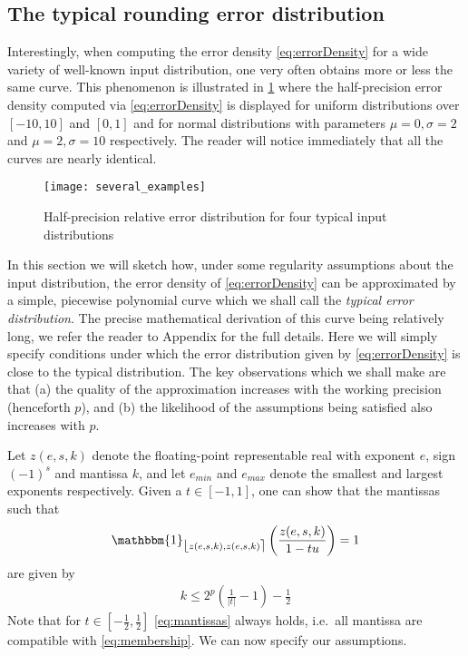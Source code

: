\documentclass[10pt,conference]{IEEEtran}
\newcommand{\ie}{i.e.\ }
\newcommand{\fintvl}[1][x]{\mathlarger{\lfloor}#1,#1\mathlarger{\rceil}}
\newcommand{\one}{\mathbbm{1}}
\newcommand{\absv}[1]{\vert #1\vert}
\begin{document}
\subsection{The typical rounding error distribution}
Interestingly, when computing the error density \cref{eq:errorDensity} for a wide variety of well-known input distribution, one very often obtains more or less the same curve. This phenomenon is illustrated in \cref{fig:errdist} where the half-precision error density computed via \cref{eq:errorDensity} is displayed for uniform distributions over $\left[-10,10\right]$ and $\left[0,1\right]$ and for normal distributions with parameters $\mu=0,\sigma=2$ and $\mu=2,\sigma=10$ respectively. The reader will notice immediately that all the curves are nearly identical.
\begin{figure}[h!]
\hspace{-1ex}\texttt{[image: several\_examples]}
\caption{Half-precision relative error distribution for four typical input distributions}
\label{fig:errdist}
\end{figure}
In this section we will sketch how, under some regularity assumptions about the input distribution, the error density of \cref{eq:errorDensity} can be approximated by a simple, piecewise polynomial curve which we shall call the \emph{typical error distribution}. The precise mathematical derivation of this curve being relatively long, we refer the reader to Appendix for the full details. Here we will simply specify conditions under which the error distribution given by \cref{eq:errorDensity} is close to the typical distribution. The key observations which we shall make are that (a) the quality of the approximation increases with the working precision (henceforth $p$), and (b) the likelihood of the assumptions being satisfied also increases with $p$.

Let $z(e,s,k)$ denote the floating-point representable real with exponent $e$, sign $(-1)^s$ and mantissa $k$, and let $e_{min}$ and $e_{max}$ denote the smallest and largest exponents respectively. Given a $t\in \left[-1,1\right]$, one can show that the mantissas such that
\begin{align}
\one_{\fintvl[z(e,s,k)]}\left(\frac{z(e,s,k)}{1-tu}\right)=1\label{eq:membership}
\end{align}
are given by 
\begin{align}
k\leq 2^p\left(\frac{1}{\absv{t}}-1\right)-\frac{1}{2}\label{eq:mantissas}
\end{align}
Note that for $t\in \left[-\frac{1}{2},\frac{1}{2}\right]$ \cref{eq:mantissas} always holds, \ie all mantissa are compatible with \cref{eq:membership}.
We can now specify our assumptions.
\end{document}
